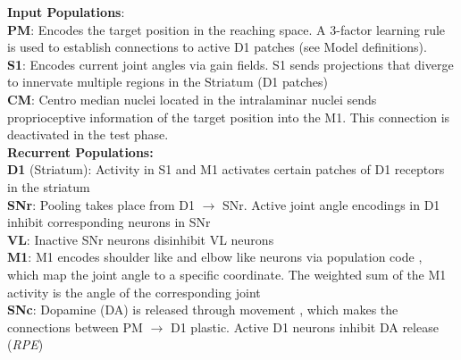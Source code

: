 \justifying
\textbf{\textcolor{training-set}{Input Populations}}:\\[4pt]
\footnotesize
\textbf{PM}: Encodes the target position in the reaching space. A 3-factor learning rule is used to establish connections to active D1 patches (see Model definitions).\\[2pt]
\textbf{S1}: Encodes current joint angles via gain fields. S1 sends projections that diverge to innervate multiple regions in the Striatum (D1 patches) \parencite{flahertyCorticostriatalTransformationsPrimate1991}\\[2pt]
\textbf{CM}: Centro median nuclei located in the intralaminar nuclei sends proprioceptive information of the target position into the M1. This connection is deactivated in the test phase.\\[10pt]
\small
\textbf{Recurrent Populations:}\\[4pt]
\footnotesize
\textbf{D1} (Striatum): Activity in S1 and M1 activates certain patches of D1 receptors in the striatum\\[2pt]
\textbf{SNr}: Pooling takes place from D1 $\rightarrow$ SNr. Active joint angle encodings in D1 inhibit corresponding neurons in SNr\\[2pt]
\textbf{VL}: Inactive SNr neurons disinhibit VL neurons\\[2pt]
\textbf{M1}: M1 encodes shoulder like and elbow like neurons via population code 
\parencite{pruszynskiPrimaryMotorCortex2011}, which map the joint angle to a specific coordinate. The weighted sum of the M1 activity is the angle of the corresponding joint\\[2pt]
\textbf{SNc}: Dopamine (DA) is released through movement \parencite{cheungLearningCriticallyDrives2023}, which makes the connections between PM $\rightarrow$ D1 plastic. Active D1 neurons inhibit DA release (\textit{RPE})
